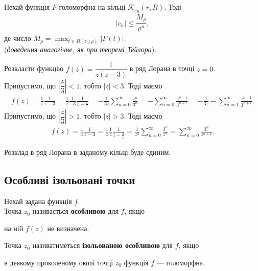 \documentclass{math_library}
\begin{document}
\begin{corollary}
Нехай функція $F$ голоморфна на кільці $\mathcal{K}_{z_0}(r,R)$. Тоді
\begin{align*}
|c_n| \leq \dfrac{M_\rho}{\rho^n},
\end{align*}
де число $M_\rho = \displaystyle\max_{t \in B(z_0;\rho)} |F(t)|$.\\
(\textit{доведення аналогічне, як при теоремі Тейлора}).
\end{corollary}

\begin{example}
Розкласти функцію $f(z) = \dfrac{1}{z(z-3)}$ в ряд Лорана в точці $z = 0$.
\bigskip \\
Припустимо, що $\left|\dfrac{z}{3}\right| < 1$, тобто $|z| < 3$. Тоді маємо
\begin{align*}
f(z) = \frac{1}{z} \frac{1}{z-3} = \frac{1}{z} \frac{1}{-3} \frac{1}{1-\displaystyle\frac{z}{3}} = -\frac{1}{3z} \sum_{n=0}^{\infty} \frac{z^n}{3^n} = -\sum_{n=0}^{\infty} \frac{z^{n-1}}{3^{n+1}} = -\frac{1}{3z} - \sum_{n=1}^{\infty} \frac{z^{n-1}}{3^{n+1}}.
\end{align*}
Припустимо, що $\left|\dfrac{z}{3}\right| > 1$, тобто $|z| > 3$. Тоді маємо
\begin{align*}
f(z) = \frac{1}{z} \frac{1}{z-3} = \frac{1}{z} \frac{1}{z} \frac{1}{1-\displaystyle\frac{3}{z}} = \frac{1}{z^2} \sum_{n=0}^{\infty} \frac{3^n}{z^n} = \sum_{n=0}^{\infty} \frac{3^n}{z^{n+2}}.
\end{align*}
\end{example}

\begin{remark}
Розклад в ряд Лорана в заданому кільці буде єдиним.
\end{remark}

\subsection{Особливі ізольовані точки}
\begin{definition}
Нехай задана функція $f$.\\
Точка $z_0$ називається \textbf{особливою} для $f$, якщо 
\begin{center}
на ній $f(z)$ не визначена.
\end{center}
Точка $z_0$ називатиметься \textbf{ізольованою особливою} для $f$, якщо
\begin{center}
в деякому проколеному околі точці $z_0$ функція $f$ --- голоморфна.
\end{center}
\end{definition}
\end{document}
